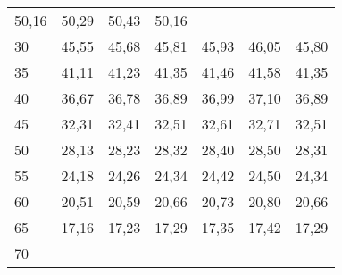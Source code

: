 \begin{tabular}{lllllll}
  \multicolumn{1}{r}{50,16} &
  \multicolumn{1}{r}{50,29} &
  \multicolumn{1}{r}{50,43} &
  \multicolumn{1}{r}{50,16} \\
\multicolumn{1}{l}{\hspace{1em}30} &
  \multicolumn{1}{|r}{45,55} &
  \multicolumn{1}{r}{45,68} &
  \multicolumn{1}{r}{45,81} &
  \multicolumn{1}{r}{45,93} &
  \multicolumn{1}{r}{46,05} &
  \multicolumn{1}{r}{45,80} \\
\multicolumn{1}{l}{\hspace{1em}35} &
  \multicolumn{1}{|r}{41,11} &
  \multicolumn{1}{r}{41,23} &
  \multicolumn{1}{r}{41,35} &
  \multicolumn{1}{r}{41,46} &
  \multicolumn{1}{r}{41,58} &
  \multicolumn{1}{r}{41,35} \\
\multicolumn{1}{l}{\hspace{1em}40} &
  \multicolumn{1}{|r}{36,67} &
  \multicolumn{1}{r}{36,78} &
  \multicolumn{1}{r}{36,89} &
  \multicolumn{1}{r}{36,99} &
  \multicolumn{1}{r}{37,10} &
  \multicolumn{1}{r}{36,89} \\
\multicolumn{1}{l}{\hspace{1em}45} &
  \multicolumn{1}{|r}{32,31} &
  \multicolumn{1}{r}{32,41} &
  \multicolumn{1}{r}{32,51} &
  \multicolumn{1}{r}{32,61} &
  \multicolumn{1}{r}{32,71} &
  \multicolumn{1}{r}{32,51} \\
\multicolumn{1}{l}{\hspace{1em}50} &
  \multicolumn{1}{|r}{28,13} &
  \multicolumn{1}{r}{28,23} &
  \multicolumn{1}{r}{28,32} &
  \multicolumn{1}{r}{28,40} &
  \multicolumn{1}{r}{28,50} &
  \multicolumn{1}{r}{28,31} \\
\multicolumn{1}{l}{\hspace{1em}55} &
  \multicolumn{1}{|r}{24,18} &
  \multicolumn{1}{r}{24,26} &
  \multicolumn{1}{r}{24,34} &
  \multicolumn{1}{r}{24,42} &
  \multicolumn{1}{r}{24,50} &
  \multicolumn{1}{r}{24,34} \\
\multicolumn{1}{l}{\hspace{1em}60} &
  \multicolumn{1}{|r}{20,51} &
  \multicolumn{1}{r}{20,59} &
  \multicolumn{1}{r}{20,66} &
  \multicolumn{1}{r}{20,73} &
  \multicolumn{1}{r}{20,80} &
  \multicolumn{1}{r}{20,66} \\
\multicolumn{1}{l}{\hspace{1em}65} &
  \multicolumn{1}{|r}{17,16} &
  \multicolumn{1}{r}{17,23} &
  \multicolumn{1}{r}{17,29} &
  \multicolumn{1}{r}{17,35} &
  \multicolumn{1}{r}{17,42} &
  \multicolumn{1}{r}{17,29} \\
\multicolumn{1}{l}{\hspace{1em}70} &

\end{tabular}
